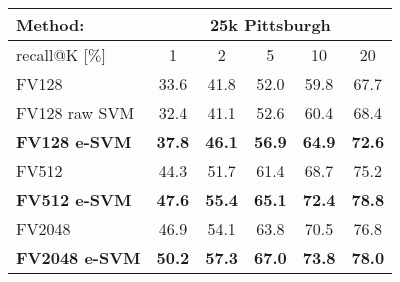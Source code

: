 
\begin{tabularx}{0.97\linewidth}{|l|c c c c c|}
  \hline 
  \rowcolor{maroon!50}
  Method: & \multicolumn{5}{c|}{25k Pittsburgh}\\
  \hline 
  \hline 
  \rowcolor{maroon!50}
  recall@K [$\%$]         & 1 & 2 & 5 & 10 & 20 \\
  \hline
  \rowcolor{maroon!10}
  FV128                   & 33.6 & 41.8 & 52.0 & 59.8 & 67.7 \\
  \rowcolor{maroon!10}
  FV128 raw SVM           & 32.4 & 41.1 & 52.6 & 60.4 & 68.4 \\
  \rowcolor{maroon!10}
  \textbf{FV128 e-SVM}    & \textbf{37.8}  & \textbf{46.1} & \textbf{56.9} & \textbf{64.9} & \textbf{72.6}  \\
  \hline
  \rowcolor{maroon!10}
  FV512                 & 44.3 & 51.7 & 61.4 & 68.7 & 75.2 \\
  \rowcolor{maroon!10}
  \textbf{FV512 e-SVM}  & \textbf{47.6}  & \textbf{55.4} & \textbf{65.1} & \textbf{72.4} & \textbf{78.8} \\
  \hline
  \rowcolor{maroon!10}
  FV2048        & 46.9    & 54.1 & 63.8 & 70.5 & 76.8 \\
  \rowcolor{maroon!10}
  \textbf{FV2048 e-SVM}   & \textbf{50.2} & \textbf{57.3} & \textbf{67.0} & \textbf{73.8} & \textbf{78.0} \\
  \hline
\end{tabularx}